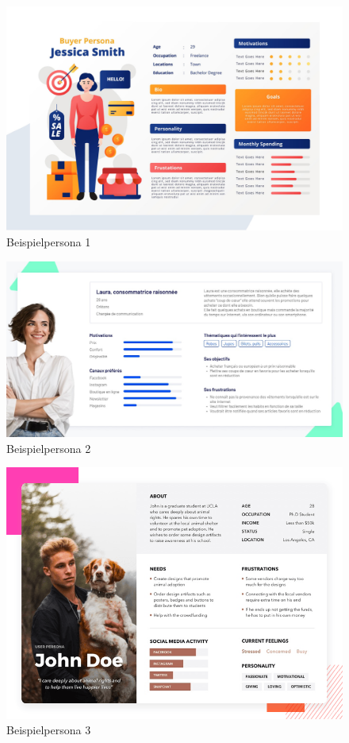 \begin{figure}[htp]
    \centering
    \includegraphics[width=\textwidth]{images/2-Personas/bspPersona1.jpg}
    \caption{Beispielpersona 1 \cite{captainverifyBuyerPersona}}
    \label{fig:bspPersona1}
\end{figure}

\begin{figure}[htp]
    \centering
    \includegraphics[width=\textwidth]{images/2-Personas/bspPersona2.jpg}
    \caption{Beispielpersona 2 \cite{interactiondesignWhatPersonas}}
    \label{fig:bspPersona2}
\end{figure}

\begin{figure}[htp]
    \centering
    \includegraphics[width=\textwidth]{images/2-Personas/bspPersona3.jpg}
    \caption{Beispielpersona 3 \cite{uxplanetGuideCreating}}
    \label{fig:bspPersona3}
\end{figure}